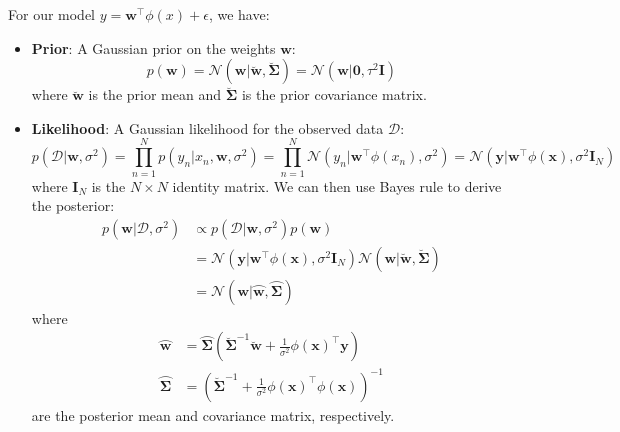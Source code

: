 \documentclass[11pt, a4paper, oneside]{memoir}
\begin{document}
For our model $y = \boldsymbol{w}^\top \phi(x) + \epsilon$, we have:
\begin{itemize}
    \item \textbf{Prior}: A Gaussian prior on the weights $\boldsymbol{w}$:
          \[ p(\boldsymbol{w}) = \mathcal{N}(\boldsymbol{w} | \breve{\boldsymbol{w}}, \breve{\boldsymbol{\Sigma}}) = \mathcal{N}(\boldsymbol{w} | \boldsymbol{0}, \tau^2 \boldsymbol{I}) \]
          where $\breve{\boldsymbol{w}}$ is the prior mean and $\breve{\boldsymbol{\Sigma}}$ is the prior covariance matrix.

    \item \textbf{Likelihood}: A Gaussian likelihood for the observed data $\mathcal{D}$:
          \[ p(\mathcal{D} | \boldsymbol{w}, \sigma^2) = \prod_{n=1}^N p(y_n | x_n, \boldsymbol{w}, \sigma^2) = \prod_{n=1}^N \mathcal{N}(y_n | \boldsymbol{w}^\top \phi(x_n), \sigma^2) = \mathcal{N}(\boldsymbol{y} | \boldsymbol{w}^\top \phi(\boldsymbol{x}), \sigma^2 \boldsymbol{I}_N) \]
          where $\boldsymbol{I}_N$ is the $N \times N$ identity matrix. We can then use Bayes rule to derive the posterior:
          \begin{align*}
              p(\boldsymbol{w} | \mathcal{D}, \sigma^2) & \propto p(\mathcal{D} | \boldsymbol{w}, \sigma^2) p(\boldsymbol{w})                                                                                                                   \\
                                                        & = \mathcal{N}(\boldsymbol{y} | \boldsymbol{w}^\top \phi(\boldsymbol{x}), \sigma^2 \boldsymbol{I}_N) \mathcal{N}(\boldsymbol{w} | \breve{\boldsymbol{w}}, \breve{\boldsymbol{\Sigma}}) \\
                                                        & = \mathcal{N}(\boldsymbol{w} | \wideparen{\boldsymbol{w}}, \wideparen{\boldsymbol{\Sigma}})
          \end{align*}
          where
          \begin{align*}
              \wideparen{\boldsymbol{w}}      & = \wideparen{\boldsymbol{\Sigma}} (\breve{\boldsymbol{\Sigma}}^{-1} \breve{\boldsymbol{w}} + \frac{1}{\sigma^2} \phi(\boldsymbol{x})^\top \boldsymbol{y}) \\
              \wideparen{\boldsymbol{\Sigma}} & = (\breve{\boldsymbol{\Sigma}}^{-1} + \frac{1}{\sigma^2} \phi(\boldsymbol{x})^\top \phi(\boldsymbol{x}))^{-1}
          \end{align*}
          are the posterior mean and covariance matrix, respectively.
\end{itemize}
\end{document}
